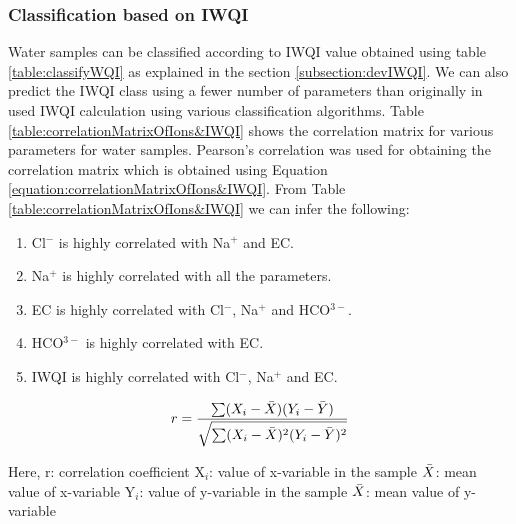 \subsubsection{Classification based on IWQI}
\label{subsubsection:classificationBasedOnIWQI}
Water samples can be classified according to IWQI value obtained using table \ref{table:classifyWQI} as explained in the section \ref{subsection:devIWQI}. We can also predict the IWQI class using a fewer number of parameters than originally in used IWQI calculation using various classification algorithms. Table \ref{table:correlationMatrixOfIons&IWQI} shows the correlation matrix for various parameters for water samples. Pearson’s correlation was used for obtaining the correlation matrix which is obtained using Equation \ref{equation:correlationMatrixOfIons&IWQI}. From Table \ref{table:correlationMatrixOfIons&IWQI} we can infer the following:
\begin{enumerate}
    \item Cl$^-$ is highly correlated with Na$^+$ and EC.
    \item Na$^+$ is highly correlated with all the parameters.
    \item EC is highly correlated with Cl$^-$, Na$^+$ and HCO$^{3-}$.
    \item HCO$^{3-}$ is highly correlated with EC.
    \item IWQI is highly correlated with Cl$^-$, Na$^+$ and EC.
\end{enumerate}

\begin{equation}
    r = \frac{\sum(X_i - \Bar{X})(Y_i - \Bar{Y})}{\sqrt{\sum(X_i - \Bar{X})^2(Y_i - \Bar{Y})^2}}
\label{equation:correlationMatrixOfIons&IWQI}
\end{equation}

Here, \newline
r: correlation coefficient \newline
X$_i$: value of x-variable in the sample \newline
$\Bar{X}$: mean value of x-variable \newline
Y$_i$: value of y-variable in the sample \newline
$\Bar{X}$: mean value of y-variable



